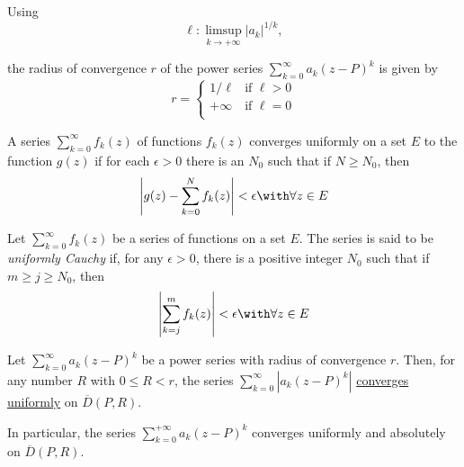 \label{a9ba20f}

Using
$$
	\ell:\limsup_{k\to+\infty}|a_k|^{1/k},
$$

the radius of convergence $r$ of the power series $\sum_{k=0}^\infty
	a_k(z-P)^k$ is given by
\begin{equation*}
	r=\begin{cases}
		1/\ell  & \text{if } \ell>0 \\
		+\infty & \text{if } \ell=0 \\
	\end{cases}
\end{equation*}

\label{bba67e4}

A series $\sum_{k=0}^\infty f_k(z)$ of functions $f_k(z)$ converges
uniformly on a set $E$ to the function $g(z)$ if for each $\epsilon>0$
there is an $N_0$ such that if $N\geq N_0$, then
$$
	\left|g(z)-\sum_{k=0}^N f_k(z)\right|<\epsilon\with\forall z\in E
$$

\label{bfe260e}

Let $\sum_{k=0}^\infty f_k(z)$ be a series of functions on a set $E$.
The series is said to be \textit{uniformly Cauchy} if, for any
$\epsilon>0$, there is a positive integer $N_0$ such that if $m\geq
	j\geq N_0$, then
$$
	\left|\sum_{k=j}^mf_k(z)\right|<\epsilon\with\forall z\in E
$$

\label{ec076c1}

Let $\sum_{k=0}^\infty a_k(z-P)^k$ be a power series with radius of
convergence $r$. Then, for any number $R$ with $0\leq R<r$, the series
$\sum_{k=0}^\infty|a_k(z-P)^k|$ \href{bba67e4}{converges uniformly} on
$\overline D(P,R)$.

In particular, the series $\sum_{k=0}^{+\infty}a_k(z-P)^k$ converges
uniformly and absolutely on $\overline D(P,R)$.
